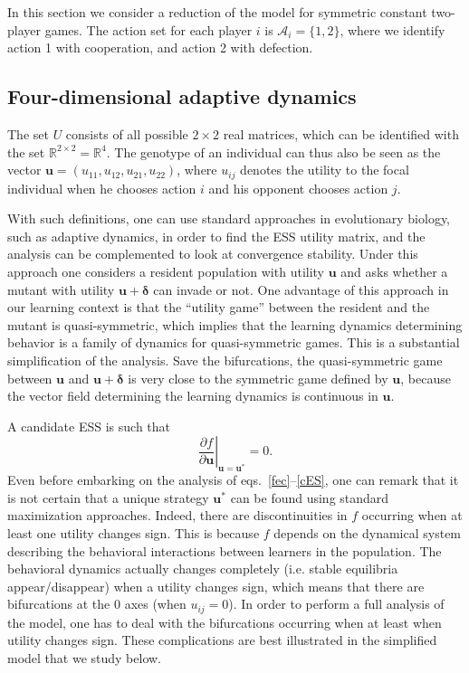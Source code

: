 \documentclass[11pt,reqno]{amsart}
\newcommand{\Ac}{\mathcal{A}} %
\newcommand{\Rn}{\mathds{R}} %
\newcommand{\fc}{f} %
\newcommand{\pf}{u} %
\newcommand{\vpf}{\mathbf{u}} %
\newcommand{\Pf}{U} %
\newcommand{\pd}{\partial}
\newcommand{\dv}{\delta} %
\newcommand{\vd}{\boldsymbol{\dv}}
\begin{document}
In this section we consider a reduction of the model for symmetric constant two-player games. The action set for each player $i$ is $\Ac_{i} = \{ 1,2 \}$, where we identify action 1 with cooperation, and action 2 with defection.


\subsection{Four-dimensional adaptive dynamics}

The set $\Pf$ consists of all possible $2\times 2$ real matrices, which can be identified with the set $\Rn^{2\times 2}=\Rn^4$. The genotype of an individual can thus also be seen as the vector $\vpf = (\pf_{11},\pf_{12},\pf_{21},\pf_{22})$, where $\pf_{ij}$ denotes the utility to the focal individual when he chooses action $i$ and his opponent chooses action $j$.

With such definitions, one can use standard approaches in evolutionary biology, such as adaptive dynamics, in order to find the ESS utility matrix, and the analysis can be complemented to look at convergence stability. Under this approach one considers a resident population with utility $\vpf$ and asks whether a mutant with utility $\vpf+\vd$ can invade or not. One advantage of this approach in our learning context is that the ``utility game'' between the resident and the mutant is quasi-symmetric, which implies that the learning dynamics determining behavior is a family of dynamics for quasi-symmetric games. This is a substantial simplification of the analysis. Save the bifurcations, the quasi-symmetric game between $\vpf$ and $\vpf+\vd$ is very close to the symmetric game defined by $\vpf$, because the vector field determining the learning dynamics is continuous in $\vpf$.

A candidate ESS is such that
\begin{equation}
\label{cES}
\left. \frac{\pd \fc}{\pd \vpf}\right|_{\vpf=\vpf^*} = 0.
\end{equation}
Even before embarking on the analysis of eqs.~\ref{fec}--\ref{cES}, one can remark that it is not certain that a unique strategy $\vpf^*$ can be found using standard maximization approaches. Indeed, there are discontinuities in $\fc$ occurring when at least one utility changes sign. This is because $\fc$ depends on the dynamical system describing the behavioral interactions between learners in the population. The behavioral dynamics actually changes completely (i.e. stable equilibria appear/disappear) when a utility changes sign, which means that there are bifurcations at the 0 axes (when $\pf_{ij}=0$). In order to perform a full analysis of the model, one has to deal with the bifurcations occurring when at least when utility changes sign. These complications are best illustrated in the simplified model that we study below.
\end{document}
